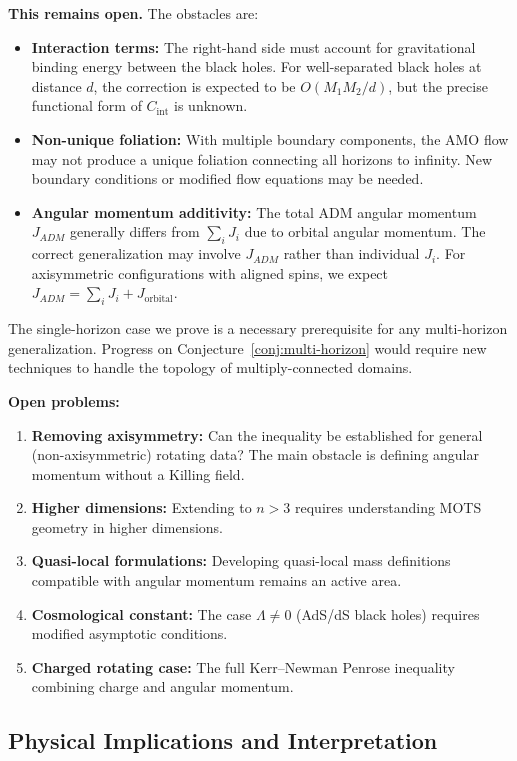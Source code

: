 \textbf{This remains open.} The obstacles are:
\begin{itemize}
    \item \textbf{Interaction terms:} The right-hand side must account for gravitational binding energy between the black holes. For well-separated black holes at distance $d$, the correction is expected to be $O(M_1 M_2/d)$, but the precise functional form of $C_{\text{int}}$ is unknown.
    \item \textbf{Non-unique foliation:} With multiple boundary components, the AMO flow may not produce a unique foliation connecting all horizons to infinity. New boundary conditions or modified flow equations may be needed.
    \item \textbf{Angular momentum additivity:} The total ADM angular momentum $J_{ADM}$ generally differs from $\sum_i J_i$ due to orbital angular momentum. The correct generalization may involve $J_{ADM}$ rather than individual $J_i$. For axisymmetric configurations with aligned spins, we expect $J_{ADM} = \sum_i J_i + J_{\text{orbital}}$.
\end{itemize}
The single-horizon case we prove is a necessary prerequisite for any multi-horizon generalization. Progress on Conjecture~\ref{conj:multi-horizon} would require new techniques to handle the topology of multiply-connected domains.

\textbf{Open problems:}
\begin{enumerate}
    \item \textbf{Removing axisymmetry:} Can the inequality be established for general (non-axisymmetric) rotating data? The main obstacle is defining angular momentum without a Killing field.
    \item \textbf{Higher dimensions:} Extending to $n > 3$ requires understanding MOTS geometry in higher dimensions.
    \item \textbf{Quasi-local formulations:} Developing quasi-local mass definitions compatible with angular momentum remains an active area.
    \item \textbf{Cosmological constant:} The case $\Lambda \neq 0$ (AdS/dS black holes) requires modified asymptotic conditions.
    \item \textbf{Charged rotating case:} The full Kerr--Newman Penrose inequality combining charge and angular momentum.
\end{enumerate}

\subsection{Physical Implications and Interpretation}

